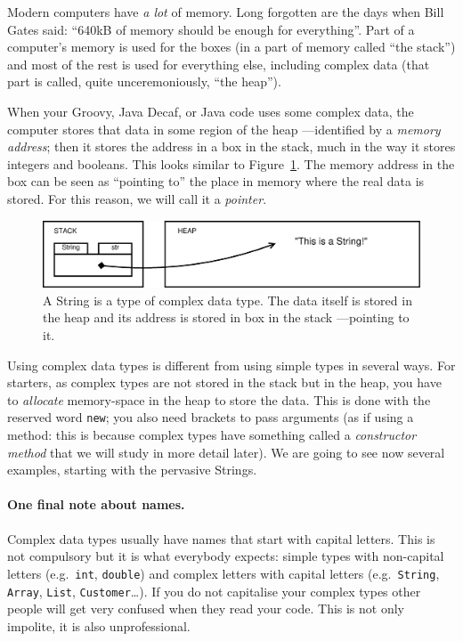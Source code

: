 Modern computers have \emph{a lot} of memory. Long forgotten are the
days when Bill Gates said: ``640kB of memory should be enough for
everything''. Part of a computer's memory is used for the boxes (in a part of
memory called ``the stack'') and most of the rest is used for
everything else, including complex data (that part is called, quite
unceremoniously, ``the heap''). 

When your Groovy, Java Decaf, or Java code uses some complex data, the computer
stores that data in some region of the heap ---identified by a \emph{memory
  address}; then it stores the address in a box in the stack, much in
the way it stores integers and booleans. This looks similar to
Figure~\ref{fig:compledata}. The memory address in the box can be seen
as ``pointing to'' the place in memory where the real data is
stored. For this reason, we will call it a \emph{pointer}. 

\begin{figure}[htbp]
  \centering
  \includegraphics[width=\textwidth]{gfx/variables-string}
  \caption{A String is a type of complex data type. The data itself is
    stored in the heap and its address is stored in box in the stack
    ---pointing to it. }
  \label{fig:compledata}
\end{figure}

Using complex data types is different from using simple types in
several ways. For starters, as complex types are not stored in the
stack but in the heap, you have to \emph{allocate} memory-space in the
heap to store the data. This is done with the reserved word
\verb+new+; you also need brackets to pass arguments (as if using a
method: this is because complex types have something called a
\emph{constructor method} that we will study in more detail later). We are
going to see now several examples, starting with the pervasive
Strings. 

\paragraph{One final note about names.} 
Complex data types usually have names that start with capital
letters. This is not compulsory but it is what everybody expects:
simple types with non-capital letters (e.g.~\verb+int+, \verb+double+)
and complex letters with capital letters (e.g.~\verb+String+,
\verb+Array+, \verb+List+, \verb+Customer+\ldots). If you do not
capitalise your complex types other people will get very confused when
they read your code. This is not only impolite, it is also
unprofessional. 

